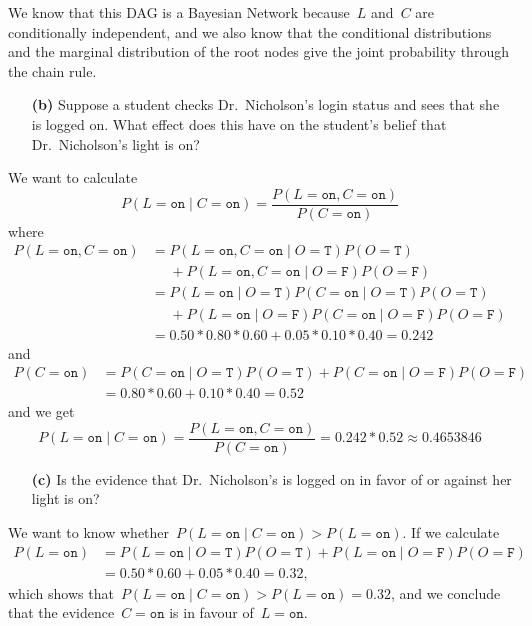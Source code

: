 \documentclass[a4paper]{article}
\newcommand{\T}{\texttt{T}}
\newcommand{\F}{\texttt{F}}
\newcommand{\on}{\texttt{on}}
\begin{document}
We know that this DAG is a Bayesian Network because~\(L\) and~\(C\) are
conditionally independent, and we also know that the conditional distributions
and the marginal distribution of the root nodes give the joint probability
through the chain rule.

\begin{enumerate}
    \item[\textbf{(b)}] Suppose a student checks Dr.\ Nicholson's login status
        and sees that she is logged on. What effect does this have on the
        student's belief that Dr.\ Nicholson's light is on?
\end{enumerate}

We want to calculate
\[
    P(L = \on \mid C = \on) = \frac{P(L = \on, C = \on)}{P(C = \on)}
\]
where
\begin{align*}
    P(L = \on, C = \on) &= P(L = \on, C = \on \mid O = \T)P(O = \T) \\
                        &\phantom{=}+ P(L = \on, C = \on \mid O = \F)P(O = \F) \\
                        &= P(L = \on \mid O = \T)P(C = \on \mid O = \T)P(O = \T) \\
                        &\phantom{=}+ P(L = \on \mid O = \F)P(C = \on \mid O = \F)P(O = \F) \\
                        &= 0.50 * 0.80 * 0.60 + 0.05 * 0.10 * 0.40 = 0.242
\end{align*}
and
\begin{align*}
    P(C = \on) &= P(C = \on \mid O = \T)P(O = \T) + P(C = \on \mid O = \F)P(O = \F) \\
               &= 0.80 * 0.60 + 0.10 * 0.40 = 0.52
\end{align*}
and we get
\[
    P(L = \on \mid C = \on) = \frac{P(L = \on, C = \on)}{P(C = \on)} = 0.242 * 0.52 \approx 0.4653846
\]

\begin{enumerate}
    \item[\textbf{(c)}] Is the evidence that Dr.\ Nicholson's is logged on in
        favor of or against her light is on?
\end{enumerate}

We want to know whether~\(P(L = \on \mid C = \on) > P(L = \on)\). If we
calculate
\begin{align*}
    P(L = \on) &= P(L = \on \mid O = \T)P(O = \T) + P(L = \on \mid O = \F)P(O = \F) \\
               &= 0.50 * 0.60 + 0.05 * 0.40 = 0.32,
\end{align*}
which shows that~\(P(L = \on \mid C = \on) > P(L = \on) = 0.32\), and we
conclude that the evidence~\(C = \on\) is in favour of~\(L = \on\).
\end{document}
